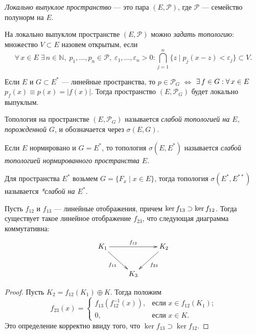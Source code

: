 \documentclass[10pt,titlepage, a4paper]{article}
\begin{document}

\begin{defen}
\emph{Локально выпуклое пространство} --- это пара
$(E,\mathcal{P})$, где $\mathcal{P}$ --- семейство полунорм на $E$.
\end{defen}

\begin{defen}
На локально выпуклом пространстве $(E,\mathcal{P})$ можно
\emph{задать топологию}: множество $V\subset E$ назовем открытым,
если $$\forall\,x\in E\;\exists\,n\in\mathbb{N},\;
p_1,\ldots,p_n\in\mathcal{P},\;\varepsilon_1,\ldots,\varepsilon_n>0:\bigcap\limits_{
j=1}^n\{z\mid p_j(x-z)<\varepsilon_j\}\subset V.$$
\end{defen}

Если $E$ и $G\subset E^*$ --- линейные пространства, то
$p\in\mathcal{P}_G$ $\Leftrightarrow$ $\exists\,f\p\in
G:\forall\,x\in E$\;\;$p_f(x)\equiv p(x)=|f(x)|$. Тогда пространство
$(E,\mathcal{P}_G)$ будет локально выпуклым.

\begin{defen}
Топология на пространстве $(E,\mathcal{P}_G)$ называется
\emph{слабой топологией на $E$, порожденной $G$}, и обозначается
через $\sigma(E,G)$.

Если $E$ нормировано и $G=E^*$, то топология $\sigma(E,E^*)$
называется \emph{слабой топологией нормированного пространства $E$}.

Для пространства $E^*$ возьмем $G=\{F_x\mid x\in E\}$, тогда
топология $\sigma(E^*, E^{**})$ называется \emph{*слабой на $E^*$}.
\end{defen}
\lecture

\begin{lemm}\label{lemm.algebra}
Пусть $f_{12}$ и $f_{13}$ --- линейные отображения, причем $\ker
f_{13}\p\supset \ker f_{12}$. Тогда существует такое линейное
отображение $f_{23}$, что следующая диаграмма коммутативна:
$$\xymatrix{
K_1 \ar@{->}[dr]_{f_{13}} \ar@{->}[rr]^{f_{12}}&& K_2\ar@{->}[dl]^{f_{23}}\\
&K_3}$$
\end{lemm}

\begin{proof}
Пусть $K_2=f_{12}(K_1)\oplus K$. Тогда положим
$$f_{23}(x)=
\begin{cases}
f_{13}(f_{12}^{-1}(x)),&\text{если $x\in f_{12}(K_1)$;}\\
0,&\text{если $x\in K.$}
\end{cases}$$
Это определение корректно ввиду того, что $\ker f_{13}\supset
\ker f_{12}$.
\end{proof}
\end{document}
